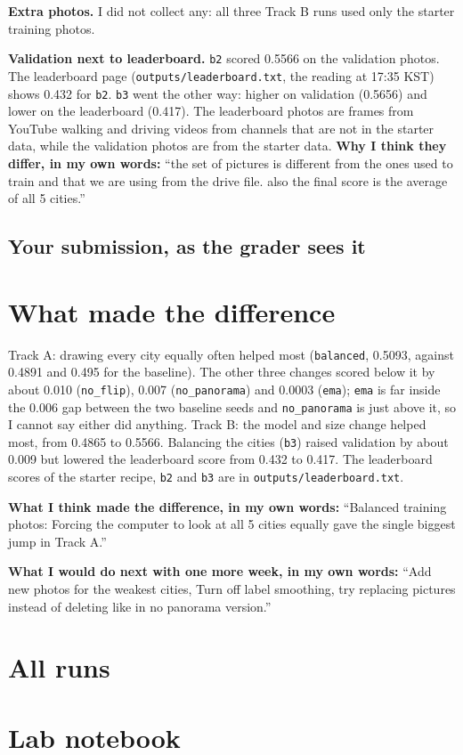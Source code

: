 \documentclass[11pt]{article}
\begin{document}
\textbf{Extra photos.} I did not collect any: all three Track B runs used only
the starter training photos.

\textbf{Validation next to leaderboard.} \texttt{b2} scored 0.5566 on the
validation photos. The leaderboard page (\texttt{outputs/leaderboard.txt}, the
reading at 17:35 KST) shows 0.432 for \texttt{b2}. \texttt{b3} went the other
way: higher on validation (0.5656) and lower on the leaderboard (0.417). The
leaderboard photos are frames from YouTube walking and driving
videos from channels that are not in the starter data, while the validation
photos are from the starter data.
\textbf{Why I think they differ, in my own words:} ``the set of pictures is
different from the ones used to train and that we are using from the drive
file. also the final score is the average of all 5 cities.''

\subsection*{Your submission, as the grader sees it}

\section*{What made the difference}

Track A: drawing every city equally often helped most (\texttt{balanced},
0.5093, against 0.4891 and 0.495 for the baseline). The other three changes
scored below it by about 0.010 (\texttt{no\_flip}), 0.007
(\texttt{no\_panorama}) and 0.0003 (\texttt{ema}); \texttt{ema} is far inside
the 0.006 gap between the two baseline seeds and \texttt{no\_panorama} is just
above it, so I cannot say either did anything.
Track B: the model and size change helped most, from 0.4865 to 0.5566.
Balancing the cities (\texttt{b3}) raised validation by about 0.009 but
lowered the leaderboard score from 0.432 to 0.417. The leaderboard scores of
the starter recipe, \texttt{b2} and \texttt{b3} are in
\texttt{outputs/leaderboard.txt}.

\textbf{What I think made the difference, in my own words:} ``Balanced
training photos: Forcing the computer to look at all 5 cities equally gave the
single biggest jump in Track A.''

\textbf{What I would do next with one more week, in my own words:} ``Add new
photos for the weakest cities, Turn off label smoothing, try replacing
pictures instead of deleting like in no panorama version.''

\section*{All runs}

\section*{Lab notebook}
\end{document}
